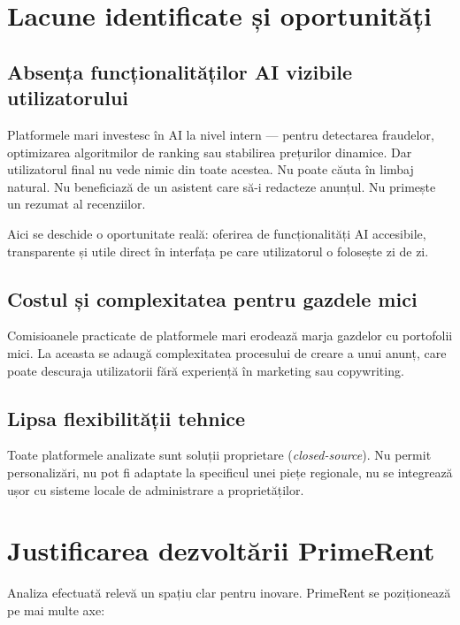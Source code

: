 \documentclass[12pt,a4paper,oneside]{report}
\begin{document}
\section{Lacune identificate și oportunități}

\subsection{Absența funcționalităților AI vizibile utilizatorului}

Platformele mari investesc în AI la nivel intern — pentru detectarea fraudelor, optimizarea algoritmilor de ranking sau stabilirea prețurilor dinamice. Dar utilizatorul final nu vede nimic din toate acestea. Nu poate căuta în limbaj natural. Nu beneficiază de un asistent care să-i redacteze anunțul. Nu primește un rezumat al recenziilor.

Aici se deschide o oportunitate reală: oferirea de funcționalități AI accesibile, transparente și utile direct în interfața pe care utilizatorul o folosește zi de zi.

\subsection{Costul și complexitatea pentru gazdele mici}

Comisioanele practicate de platformele mari erodează marja gazdelor cu portofolii mici. La aceasta se adaugă complexitatea procesului de creare a unui anunț, care poate descuraja utilizatorii fără experiență în marketing sau copywriting.

\subsection{Lipsa flexibilității tehnice}

Toate platformele analizate sunt soluții proprietare (\textit{closed-source}). Nu permit personalizări, nu pot fi adaptate la specificul unei piețe regionale, nu se integrează ușor cu sisteme locale de administrare a proprietăților.


\section{Justificarea dezvoltării PrimeRent}

Analiza efectuată relevă un spațiu clar pentru inovare. PrimeRent se poziționează pe mai multe axe:
\end{document}
